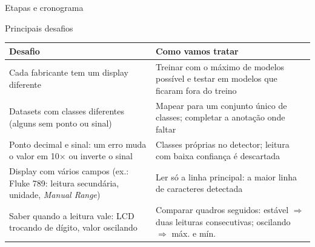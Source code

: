 \documentclass[aspectratio=169,10pt]{beamer}
\begin{document}
\begin{frame}{Etapas e cronograma}
  \centering
\end{frame}

\begin{frame}{Principais desafios}
  \small
  \begin{tabular}{@{}>{\raggedright\arraybackslash}p{}
                    >{\raggedright\arraybackslash}p{}@{}}
    \toprule
    \textbf{Desafio} & \textbf{Como vamos tratar} \\
    \midrule
    Cada fabricante tem um display diferente
      & Treinar com o máximo de modelos possível e testar em modelos
        que ficaram fora do treino \\[1mm]
    Datasets com classes diferentes (alguns sem ponto ou sinal)
      & Mapear para um conjunto único de classes; completar a anotação
        onde faltar \\[1mm]
    Ponto decimal e sinal: um erro muda o valor em 10$\times$ ou inverte o sinal
      & Classes próprias no detector; leitura com baixa confiança é descartada \\[1mm]
    Display com vários campos (ex.: Fluke 789: leitura secundária, unidade, \textit{Manual Range})
      & Ler só a linha principal: a maior linha de caracteres detectada \\[1mm]
    Saber quando a leitura vale: LCD trocando de dígito, valor oscilando
      & Comparar quadros seguidos: estável $\Rightarrow$ duas leituras
        consecutivas; oscilando $\Rightarrow$ máx. e mín. \\
    \bottomrule
  \end{tabular}
\end{frame}
\end{document}
